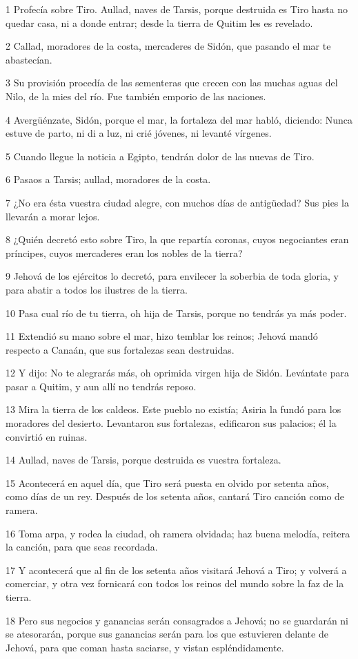 \par 1 Profecía sobre Tiro. Aullad, naves de Tarsis, porque destruida es Tiro hasta no quedar casa, ni a donde entrar; desde la tierra de Quitim les es revelado.
\par 2 Callad, moradores de la costa, mercaderes de Sidón, que pasando el mar te abastecían.
\par 3 Su provisión procedía de las sementeras que crecen con las muchas aguas del Nilo, de la mies del río. Fue también emporio de las naciones.
\par 4 Avergüénzate, Sidón, porque el mar, la fortaleza del mar habló, diciendo: Nunca estuve de parto, ni di a luz, ni crié jóvenes, ni levanté vírgenes.
\par 5 Cuando llegue la noticia a Egipto, tendrán dolor de las nuevas de Tiro.
\par 6 Pasaos a Tarsis; aullad, moradores de la costa.
\par 7 ¿No era ésta vuestra ciudad alegre, con muchos días de antigüedad? Sus pies la llevarán a morar lejos.
\par 8 ¿Quién decretó esto sobre Tiro, la que repartía coronas, cuyos negociantes eran príncipes, cuyos mercaderes eran los nobles de la tierra?
\par 9 Jehová de los ejércitos lo decretó, para envilecer la soberbia de toda gloria, y para abatir a todos los ilustres de la tierra.
\par 10 Pasa cual río de tu tierra, oh hija de Tarsis, porque no tendrás ya más poder.
\par 11 Extendió su mano sobre el mar, hizo temblar los reinos; Jehová mandó respecto a Canaán, que sus fortalezas sean destruidas.
\par 12 Y dijo: No te alegrarás más, oh oprimida virgen hija de Sidón. Levántate para pasar a Quitim, y aun allí no tendrás reposo.
\par 13 Mira la tierra de los caldeos. Este pueblo no existía; Asiria la fundó para los moradores del desierto. Levantaron sus fortalezas, edificaron sus palacios; él la convirtió en ruinas.
\par 14 Aullad, naves de Tarsis, porque destruida es vuestra fortaleza.
\par 15 Acontecerá en aquel día, que Tiro será puesta en olvido por setenta años, como días de un rey. Después de los setenta años, cantará Tiro canción como de ramera.
\par 16 Toma arpa, y rodea la ciudad, oh ramera olvidada; haz buena melodía, reitera la canción, para que seas recordada.
\par 17 Y acontecerá que al fin de los setenta años visitará Jehová a Tiro; y volverá a comerciar, y otra vez fornicará con todos los reinos del mundo sobre la faz de la tierra.
\par 18 Pero sus negocios y ganancias serán consagrados a Jehová; no se guardarán ni se atesorarán, porque sus ganancias serán para los que estuvieren delante de Jehová, para que coman hasta saciarse, y vistan espléndidamente. 

